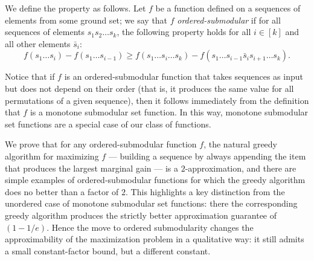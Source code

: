 We define the property as follows.
Let $f$ be a function defined on a sequences of elements from some ground set;
we say that $f$ \emph{ordered-submodular} if for all
sequences of elements $s_1 s_2 \dots s_k$, the following property
holds for all $i \in [k]$ and all other elements $\bar{s}_i$: 
$$f(s_1 \dots s_i) -
f(s_1 \dots s_{i-1}) \ge f(s_1 \dots s_i \dots s_k) - f(s_1 \dots
s_{i-1} \bar{s}_i s_{i+1} \dots s_k).$$

Notice that if $f$ is an ordered-submodular function that takes
sequences as input but does not depend on their order
(that is, it produces the same value for all permutations of
a given sequence), then it follows immediately from the definition
that $f$ is a monotone submodular set function.
In this way, monotone submodular set functions are a special
case of our class of functions.

We prove that for any ordered-submodular function $f$,
the natural greedy algorithm for maximizing $f$ --- building 
a sequence by always appending the item that produces the
largest marginal gain --- is a $2$-approximation, and there
are simple examples of ordered-submodular functions for which
the greedy algorithm does no better than a factor of $2$.
This highlights a key distinction from the unordered case of
monotone submodular set functions: there the corresponding
greedy algorithm produces the strictly better approximation
guarantee of $(1 - 1/e)$. 
Hence the move to ordered submodularity
changes the approximability of the maximization problem
in a qualitative way: it still admits a small constant-factor bound,
but a different constant.

